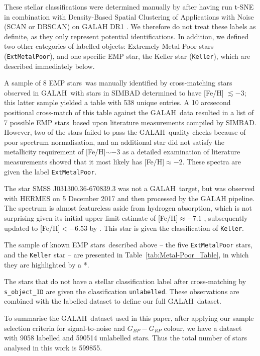 \documentclass[]{aastex631}
\newcommand{\g}{GALAH\xspace}
\newcommand{\emp}{EMP star\xspace}
\newcommand{\emps}{EMP stars\xspace}
\newcommand{\feh}{[Fe/H]\xspace}
\begin{document}
These stellar classifications were determined manually by \citet{traven_galah_2017} after having run t-SNE in combination with Density-Based  Spatial  Clustering  of  Applications with Noise (SCAN or DBSCAN)  \citep{ester_density-based_1996} on GALAH DR1 \citep{martell_galah_2017}. We therefore do not treat these labels as definite, as they only represent potential identifications. In addition, we defined two other categories of labelled objects: Extremely Metal-Poor stars ({\tt ExtMetalPoor}), and one specific \emp, the Keller star ({\tt Keller}), which are described immediately below. 

A sample of 8 \emps \ was manually identified by cross-matching stars observed in \g \ with stars in SIMBAD determined to have [Fe/H] $\lesssim -3$; this latter sample yielded a table with 538 unique entries. 
A 10 arcsecond positional cross-match of this table against the  \g \ data resulted in a list of 7 possible \emps \ based upon literature measurements compiled by SIMBAD.  
However, two of the stars failed to pass the \g \ quality checks because of poor spectrum normalisation, and an additional star did not satisfy the metallicity requirement of \feh $\sim -3$ as a detailed examination of literature measurements showed that it most likely has \feh $\approx -2$. These spectra are given the label {\tt ExtMetalPoor}.

The star SMSS J031300.36-670839.3 \citep{keller_single_2014} was not a \g \ target, but was observed with HERMES on 5 December 2017 and then processed by the GALAH pipeline. The spectrum is almost featureless aside from hydrogen absorption, which is not surprising given its initial upper limit estimate of \feh $\approx -7.1$ \citep{keller_single_2014}, subsequently updated to \feh $< -6.53$ by \citet{2017A&A...597A...6N}. This star is given the classification of {\tt Keller}. 

The sample of known \emps \ described above -- the five {\tt ExtMetalPoor} stars, and the {\tt Keller} star -- are presented in Table~\ref{tab:Metal-Poor_Table}, in which they are highlighted by a *.


The stars that do not have a stellar classification label after cross-matching by {\tt s\_object\_ID} are given the classification {\tt unlabelled}.
These observations are combined with the labelled dataset to define our full \g \ dataset. 

To summarise the \g \  dataset used in this paper, after applying our sample selection criteria for signal-to-noise and $G_{BP} - G_{RP}$ colour, we have a dataset with 9058 labelled and 590514 unlabelled stars. Thus the total number of stars analysed in this work is 599855.
\end{document}
